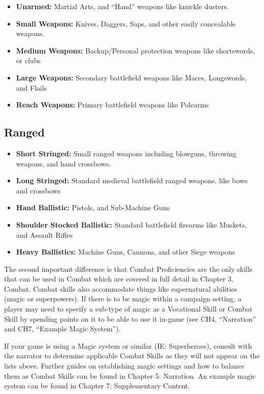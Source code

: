 \begin{itemize}
    \item \textbf{Unarmed:} Martial Arts, and “Hand” weapons like knuckle dusters.
    \item \textbf{Small Weapons:} Knives, Daggers, Saps, and other easily concealable weapons.
    \item \textbf{Medium Weapons:} Backup/Personal protection weapons like shortswords, or clubs
    \item \textbf{Large Weapons:} Secondary battlefield weapons like Maces, Longswords, and Flails
    \item \textbf{Reach Weapons:} Primary battlefield weapons like Polearms
\end{itemize}

\subsection{Ranged} \label{subsec:ranged}

\begin{itemize}
    \item \textbf{Short Stringed:} Small ranged weapons including blowguns, throwing weapons, and hand crossbows.
    \item \textbf{Long Stringed:} Standard medieval battlefield ranged weapons, like bows and crossbows
    \item \textbf{Hand Ballistic:} Pistols, and Sub-Machine Guns
    \item \textbf{Shoulder Stocked Ballistic:} Standard battlefield firearms like Muskets, and Assault Rifles
    \item \textbf{Heavy Ballistics:} Machine Guns, Cannons, and other Siege weapons
\end{itemize}

The second important difference is that Combat Proficiencies are the only skills that can be used in Combat which are covered in full detail in Chapter 3, Combat. Combat skills also accommodate things like supernatural abilities (magic or superpowers). If there is to be magic within a campaign setting, a player may need to specify a sub-type of magic as a Vocational Skill or Combat Skill by spending points on it to be able to use it in-game (see CH4, “Narration” and CH7, “Example Magic System”).

If your game is using a Magic system or similar (IE: Superheroes), consult with the narrator to determine applicable Combat Skills as they will not appear on the lists above. Further guides on establishing magic settings and how to balance them as Combat Skills can be found in Chapter 5: Narration. An example magic system can be found in Chapter 7: Supplementary Content.